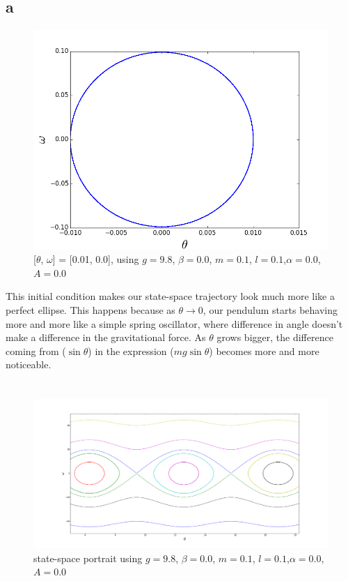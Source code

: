 \documentclass[12pt]{article}\pagestyle{myheadings}
\theoremstyle{plain}
\begin{document}
\subsection{a}	
\begin{figure}[H]
\centering
\includegraphics[scale=.25]{2b}
\caption{[$\theta$, $\omega$] = [0.01, 0.0], using $g = 9.8$, $\beta = 0.0$, $m = 0.1$, $l = 0.1$,$\alpha = 0.0$, $A = 0.0$}
\label{fig:my_label}
\end{figure}

This initial condition makes our state-space trajectory look much more like a perfect ellipse. This happens because as $\theta \to 0$, our pendulum starts behaving more and more like a simple spring oscillator, where difference in angle doesn't make a difference in the gravitational force. As  $\theta$ grows bigger, the difference coming from ($\sin{\theta}$) in the expression ($mg\sin{\theta}$) becomes more and more noticeable. 


\section{}

\begin{figure}[H]
\centering
\includegraphics[scale=.15]{3}
\caption{state-space portrait using $g = 9.8$, $\beta = 0.0$, $m = 0.1$, $l = 0.1$,$\alpha = 0.0$, $A = 0.0$}
\label{fig:my_label}
\end{figure}
\end{document}

